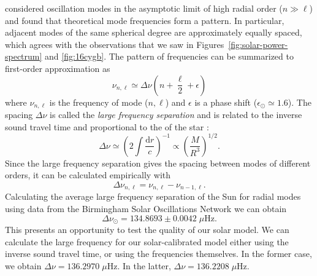 \citet{1980ApJS...43..469T} considered oscillation modes in the asymptotic limit of high radial order (${n\gg\ell}$) and found that theoretical mode frequencies form a pattern. 
In particular, adjacent modes of the same spherical degree are approximately equally spaced, which agrees with the observations that we saw in Figures~\ref{fig:solar-power-spectrum} and \ref{fig:16cygb}. 
The pattern of frequencies can be summarized to first-order approximation as 
\begin{equation} \label{eq:asymptotic}
    \nu_{n,\ell} \simeq \Delta\nu \left( n + \frac{\ell}{2} + \epsilon \right)
\end{equation}
where $\nu_{n,\ell}$ is the frequency of mode (${n,\ell}$) and $\epsilon$ is a phase shift (${\epsilon_\odot\simeq 1.6}$). 
The spacing ${\Delta\nu}$ is called the \emph{large frequency separation} and is related to the inverse sound travel time and proportional to the  of the star \citep{1986apj...306l..37u, 1995A&A...293...87K}:
\begin{equation}
    \Delta\nu
    \simeq
    \left( 
        2 \int \frac{\text{d}r}{c}
    \right)^{-1}
    \propto
    \left(
        \frac{M}{R^3}
    \right)^{1/2}. 
\end{equation}
Since the large frequency separation gives the spacing between modes of different orders, it can be calculated empirically with
\begin{equation} \label{eq:Dnu}
    \Delta\nu_{n,\ell} 
    =
    \nu_{n,\ell}
    -
    \nu_{n-1,\ell}.
\end{equation}
Calculating the average large frequency separation of the Sun for radial modes using data from the Birmingham Solar Oscillations Network \citep[\emph{BiSON},][]{2009mnras.396l.100b} we can obtain 
\begin{equation}
    \Delta\nu_\odot = 134.8693 \pm 0.0042\;\mu\text{Hz}. 
\end{equation}
This presents an opportunity to test the quality of our solar model. 
We can calculate the large frequency for our solar-calibrated model either using the inverse sound travel time, or using the frequencies themselves. 
In the former case, we obtain ${\Delta\nu = 136.2970\;\mu\text{Hz}}$. 
In the latter, ${\Delta\nu = 136.2208\;\mu\text{Hz}}$. 

